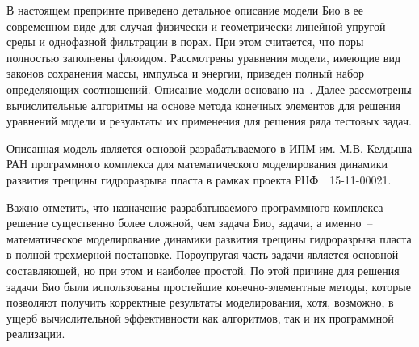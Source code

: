 В настоящем препринте приведено детальное описание модели Био в ее
современном виде для случая физически и геометрически линейной упругой
среды и однофазной фильтрации в порах. При этом считается, что поры полностью
заполнены флюидом. Рассмотрены уравнения модели, имеющие вид законов
сохранения массы, импульса и энергии, приведен полный набор
определяющих соотношений. Описание модели основано на~\cite{coussy_2004}. 
Далее
рассмотрены вычислительные алгоритмы на основе метода конечных
элементов для решения уравнений модели и
результаты их применения для решения ряда тестовых задач.

Описанная модель является основой разрабатываемого в ИПМ
им. М.В. Келдыша РАН программного комплекса для
математического моделирования динамики развития трещины гидроразрыва
пласта в рамках проекта РНФ~\No~15-11-00021.

Важно отметить, что назначение разрабатываемого программного комплекса~-- решение
существенно более сложной, чем задача Био, задачи, а именно~--
математическое моделирование динамики развития трещины гидроразрыва
пласта в полной трехмерной постановке. Пороупругая часть задачи
является основной составляющей, но при этом и наиболее
простой. По этой причине для решения задачи Био были использованы
простейшие конечно-элементные методы, которые позволяют получить корректные
результаты моделирования, хотя, возможно, в ущерб вычислительной
эффективности как алгоритмов, так и их программной реализации.

\endinput
